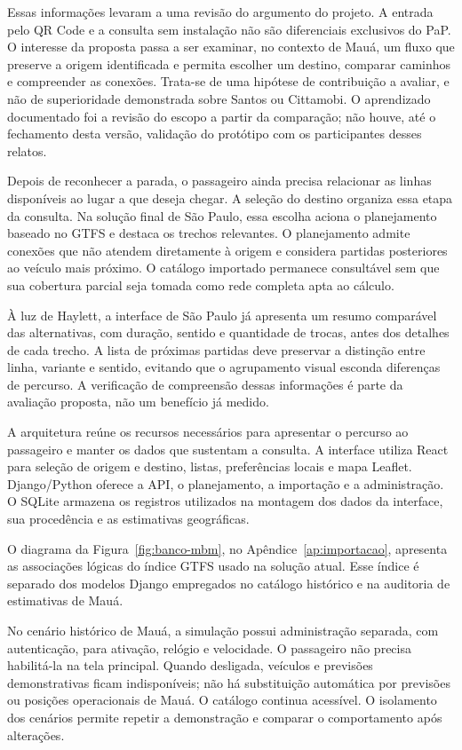 \documentclass[12pt,oneside,a4paper,brazil,chapter=TITLE]{abntex2}
\begin{document}
Essas informações levaram a uma revisão do argumento do projeto. A entrada pelo QR Code e a consulta sem instalação não são diferenciais exclusivos do PaP. O interesse da proposta passa a ser examinar, no contexto de Mauá, um fluxo que preserve a origem identificada e permita escolher um destino, comparar caminhos e compreender as conexões. Trata-se de uma hipótese de contribuição a avaliar, e não de superioridade demonstrada sobre Santos ou Cittamobi. O aprendizado documentado foi a revisão do escopo a partir da comparação; não houve, até o fechamento desta versão, validação do protótipo com os participantes desses relatos.

Depois de reconhecer a parada, o passageiro ainda precisa relacionar as linhas disponíveis ao lugar a que deseja chegar. A seleção do destino organiza essa etapa da consulta. Na solução final de São Paulo, essa escolha aciona o planejamento baseado no GTFS e destaca os trechos relevantes. O planejamento admite conexões que não atendem diretamente à origem e considera partidas posteriores ao veículo mais próximo. O catálogo importado permanece consultável sem que sua cobertura parcial seja tomada como rede completa apta ao cálculo.

À luz de Haylett, a interface de São Paulo já apresenta um resumo comparável das alternativas, com duração, sentido e quantidade de trocas, antes dos detalhes de cada trecho. A lista de próximas partidas deve preservar a distinção entre linha, variante e sentido, evitando que o agrupamento visual esconda diferenças de percurso. A verificação de compreensão dessas informações é parte da avaliação proposta, não um benefício já medido.

A arquitetura reúne os recursos necessários para apresentar o percurso ao passageiro e manter os dados que sustentam a consulta. A interface utiliza React para seleção de origem e destino, listas, preferências locais e mapa Leaflet. Django/Python oferece a API, o planejamento, a importação e a administração. O SQLite armazena os registros utilizados na montagem dos dados da interface, sua procedência e as estimativas geográficas.

O diagrama da Figura~\ref{fig:banco-mbm}, no Apêndice~\ref{ap:importacao}, apresenta as associações lógicas do índice GTFS usado na solução atual. Esse índice é separado dos modelos Django empregados no catálogo histórico e na auditoria de estimativas de Mauá.

No cenário histórico de Mauá, a simulação possui administração separada, com autenticação, para ativação, relógio e velocidade. O passageiro não precisa habilitá-la na tela principal. Quando desligada, veículos e previsões demonstrativas ficam indisponíveis; não há substituição automática por previsões ou posições operacionais de Mauá. O catálogo continua acessível. O isolamento dos cenários permite repetir a demonstração e comparar o comportamento após alterações.
\end{document}
